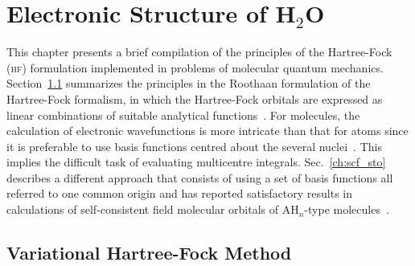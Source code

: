 
\chapter{Electronic Structure of H$_{2}$O}
\label{cha:scf_h2o}





This chapter presents a brief compilation of the principles of the
Hartree-Fock (\textsc{hf}) formulation implemented in problems of
molecular quantum mechanics. Section~\ref{ch:var_hf} summarizes the
principles in the Roothaan formulation of the Hartree-Fock formalism,
in which the Hartree-Fock orbitals are expressed as linear
combinations of suitable analytical functions~\cite{Roothaan_HF}. For
molecules, the calculation of electronic wavefunctions is more
intricate than that for atoms since it is preferable to use basis
functions centred about the several
nuclei~\cite{Pitzer_1968,Pitzer_1970}. This implies the difficult task
of evaluating multicentre integrals. Sec.~\ref{ch:scf_sto} describes a
different approach that consists of using a set of basis functions all
referred to one common origin and has reported satisfactory results in
calculations of self-consistent field molecular orbitals of
AH$_{n}$-type molecules~\cite{Moccia_JCP_2164, Moccia_1964}.


\section{Variational Hartree-Fock Method}
\label{ch:var_hf}







